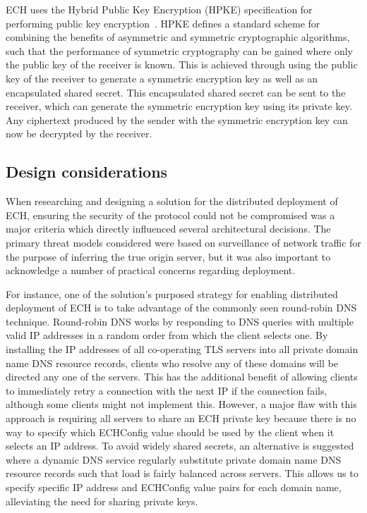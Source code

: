 \documentclass[a4paper,oneside,12pt]{article}
\begin{document}
ECH uses the Hybrid Public Key Encryption (HPKE) specification for performing public key encryption~\cite{rfc9180}. HPKE defines a standard scheme for combining the benefits of asymmetric and symmetric cryptographic algorithms, such that the performance of symmetric cryptography can be gained where only the public key of the receiver is known. This is achieved through using the public key of the receiver to generate a symmetric encryption key as well as an encapsulated shared secret. This encapsulated shared secret can be sent to the receiver, which can generate the symmetric encryption key using its private key. Any ciphertext produced by the sender with the symmetric encryption key can now be decrypted by the receiver.


\subsection*{Design considerations}

When researching and designing a solution for the distributed deployment of ECH, ensuring the security of the protocol could not be compromised was a major criteria which directly influenced several architectural decisions. The primary threat models considered were based on surveillance of network traffic for the purpose of inferring the true origin server, but it was also important to acknowledge a number of practical concerns regarding deployment.

For instance, one of the solution's purposed strategy for enabling distributed deployment of ECH is to take advantage of the commonly seen round-robin DNS technique. Round-robin DNS works by responding to DNS queries with multiple valid IP addresses in a random order from which the client selects one. By installing the IP addresses of all co-operating TLS servers into all private domain name DNS resource records, clients who resolve any of these domains will be directed any one of the servers. This has the additional benefit of allowing clients to immediately retry a connection with the next IP if the connection fails, although some clients might not implement this. However, a major flaw with this approach is requiring all servers to share an ECH private key because there is no way to specify which ECHConfig value should be used by the client when it selects an IP address. To avoid widely shared secrets, an alternative is suggested where a dynamic DNS service regularly substitute private domain name DNS resource records such that load is fairly balanced across servers. This allows us to specify specific IP address and ECHConfig value pairs for each domain name, alleviating the need for sharing private keys.
\end{document}
